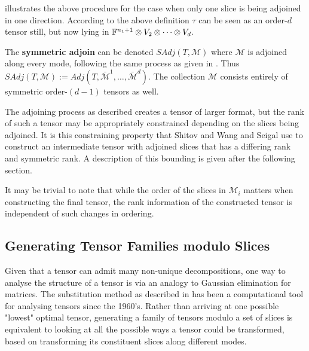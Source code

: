 \documentclass[../Lael_John_MasterThesis_Draft.tex]{subfiles}
\begin{document}
\begin{observation}
     illustrates the above procedure for the case when only one slice is being adjoined in one direction. According to the above definition $\tau$ can be seen as an order-$d$ tensor still, but now lying in $ \mathbb{F}^{n_1 + 1} \otimes V_2 \otimes \cdots \otimes V_d.$
\end{observation}

The \textbf{symmetric adjoin} can be denoted $SAdj(T, \mathcal{M})$ where $\mathcal{M}$ is adjoined along every mode, following the same process as given in . Thus $SAdj(T, \mathcal{M}) := Adj(T, \bar{\mathcal{M}}^1, \ldots, \bar{\mathcal{M}}^d)$. The collection $\mathcal{M}$ consists entirely of symmetric order-$(d-1)$ tensors as well.

The adjoining process as described creates a tensor of larger format, but the rank of such a tensor may be appropriately constrained depending on the slices being adjoined. It is this constraining property that Shitov \cite{shitov_higher_2024-1}  and Wang and Seigal \cite{wang_lower_2023} use to construct an intermediate tensor with adjoined slices that has a differing rank and symmetric rank. A description of this bounding is given after the following section.

\begin{remark}
    It may be trivial to note that while the order of the slices in $\mathcal{M}_i$ matters when constructing the final tensor, the rank information of the constructed tensor is independent of such changes in ordering.
\end{remark}

\subsection{Generating Tensor Families modulo Slices}\label{subsection:familymoduloslices}
Given that a tensor can admit many non-unique decompositions, one way to analyse the structure of a tensor is via an analogy to Gaussian elimination for matrices. The substitution method as described in \cites{landsberg_abelian_2017,alexeev_tensor_2011} has been a computational tool for analysing tensors since the 1960's. Rather than arriving at one possible "lowest" optimal tensor, generating a family of tensors modulo a set of slices is equivalent to looking at all the possible ways a tensor could be transformed, based on transforming its constituent slices along different modes.
\end{document}

